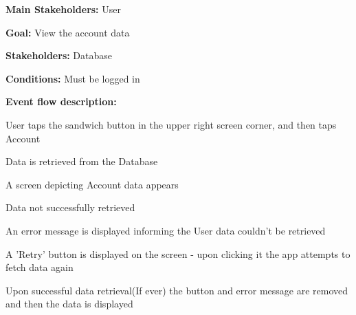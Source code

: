 				\noindent {}
				\begin{packed_item}
					\item \textbf{Main Stakeholders:} User
					\item \textbf{Goal:} View the account data
					\item \textbf{Stakeholders:} Database
					\item \textbf{Conditions:} Must be logged in
					\item \textbf{Event flow description: }
					\begin{packed_enum}
						\item User taps the sandwich button in the upper right screen corner, and then taps Account
						\item Data is retrieved from the Database
						\item A screen depicting Account data appears
					\end{packed_enum}
					
					\begin{packed_item}
						\item[2.a] Data not successfully retrieved
						\item[] \begin{packed_enum}
							\item An error message is displayed informing the User data couldn't be retrieved
							\item A 'Retry' button is displayed on the screen - upon clicking it the app attempts to fetch data again
							\item Upon successful data retrieval(If ever) the button and error message are removed and then the data is displayed
						\end{packed_enum}
					\end{packed_item}
				\end{packed_item}
			
